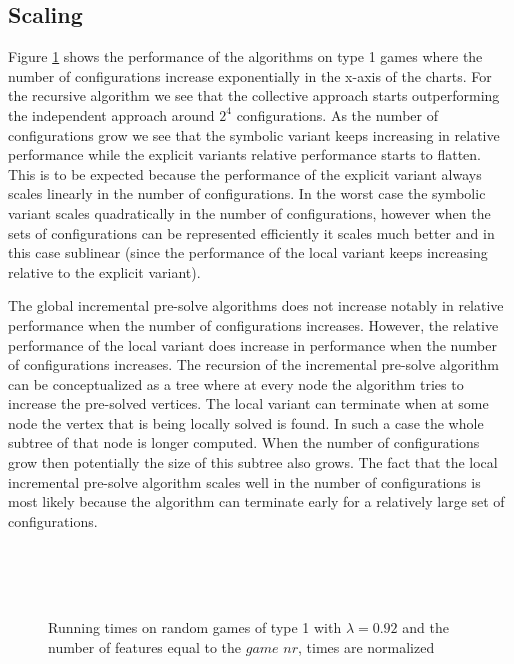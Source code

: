 \subsection{Scaling}
Figure \ref{fig:results_scalegames} shows the performance of the algorithms on type 1 games where the number of configurations increase exponentially in the x-axis of the charts. For the recursive algorithm we see that the collective approach starts outperforming the independent approach around $2^4$ configurations. As the number of configurations grow we see that the symbolic variant keeps increasing in relative performance while the explicit variants relative performance starts to flatten. This is to be expected because the performance of the explicit variant always scales linearly in the number of configurations. In the worst case the symbolic variant scales quadratically in the number of configurations, however when the sets of configurations can be represented efficiently it scales much better and in this case sublinear (since the performance of the local variant keeps increasing relative to the explicit variant).

The global incremental pre-solve algorithms does not increase notably in relative performance when the number of configurations increases. However, the relative performance of the local variant does increase in performance when the number of configurations increases. The recursion of the incremental pre-solve algorithm can be conceptualized as a tree where at every node the algorithm tries to increase the pre-solved vertices. The local variant can terminate when at some node the vertex that is being locally solved is found. In such a case the whole subtree of that node is longer computed. When the number of configurations grow then potentially the size of this subtree also grows. The fact that the local incremental pre-solve algorithm scales well in the number of configurations is most likely because the algorithm can terminate early for a relatively large set of configurations.

\begin{figure}[H]
	\centering
	\begin{multicols}{2}
		\\\vfill
		\\
		\\\vfill
		
	\end{multicols}
	\caption{Running times on random games of type 1 with $\lambda = 0.92$ and the number of features equal to the $\textit{game nr}$, times are normalized}
	\label{fig:results_scalegames}
\end{figure}%

